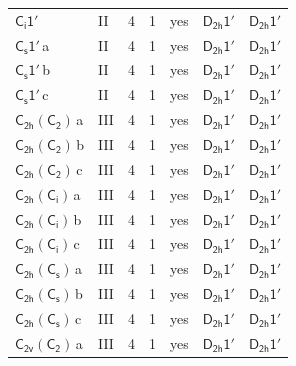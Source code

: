 \documentclass[10pt,a4paper]{article}
\numberwithin{equation}{section}
\newcommand{\grp}[1]{\mathsf{#1}}
\newcommand{\clsletter}[1]{\,{\scriptsize\color{black!55}#1}}
\begin{document}
{\begin{longtable}{@{}llrrlll@{}}
\href{S2-1p.pdf}{$\grp{C_{i}1'}$} & II & 4 & 1 & yes & \href{D2h-1p.pdf}{$\grp{D_{2h}1'}$} & \href{D2h-1p.pdf}{$\grp{D_{2h}1'}$}\\
\href{C1v-1p.pdf}{$\grp{C_{s}1'}$}\clsletter{a} & II & 4 & 1 & yes & \href{D2h-1p.pdf}{$\grp{D_{2h}1'}$} & \href{D2h-1p.pdf}{$\grp{D_{2h}1'}$}\\
\href{C1v-1p.pdf}{$\grp{C_{s}1'}$}\clsletter{b} & II & 4 & 1 & yes & \href{D2h-1p.pdf}{$\grp{D_{2h}1'}$} & \href{D2h-1p.pdf}{$\grp{D_{2h}1'}$}\\
\href{C1v-1p.pdf}{$\grp{C_{s}1'}$}\clsletter{c} & II & 4 & 1 & yes & \href{D2h-1p.pdf}{$\grp{D_{2h}1'}$} & \href{D2h-1p.pdf}{$\grp{D_{2h}1'}$}\\
\href{C2h-C2.pdf}{$\grp{C_{2h}}(\grp{C_{2}})$}\clsletter{a} & III & 4 & 1 & yes & \href{D2h-1p.pdf}{$\grp{D_{2h}1'}$} & \href{D2h-1p.pdf}{$\grp{D_{2h}1'}$}\\
\href{C2h-C2.pdf}{$\grp{C_{2h}}(\grp{C_{2}})$}\clsletter{b} & III & 4 & 1 & yes & \href{D2h-1p.pdf}{$\grp{D_{2h}1'}$} & \href{D2h-1p.pdf}{$\grp{D_{2h}1'}$}\\
\href{C2h-C2.pdf}{$\grp{C_{2h}}(\grp{C_{2}})$}\clsletter{c} & III & 4 & 1 & yes & \href{D2h-1p.pdf}{$\grp{D_{2h}1'}$} & \href{D2h-1p.pdf}{$\grp{D_{2h}1'}$}\\
\href{C2h-S2.pdf}{$\grp{C_{2h}}(\grp{C_{i}})$}\clsletter{a} & III & 4 & 1 & yes & \href{D2h-1p.pdf}{$\grp{D_{2h}1'}$} & \href{D2h-1p.pdf}{$\grp{D_{2h}1'}$}\\
\href{C2h-S2.pdf}{$\grp{C_{2h}}(\grp{C_{i}})$}\clsletter{b} & III & 4 & 1 & yes & \href{D2h-1p.pdf}{$\grp{D_{2h}1'}$} & \href{D2h-1p.pdf}{$\grp{D_{2h}1'}$}\\
\href{C2h-S2.pdf}{$\grp{C_{2h}}(\grp{C_{i}})$}\clsletter{c} & III & 4 & 1 & yes & \href{D2h-1p.pdf}{$\grp{D_{2h}1'}$} & \href{D2h-1p.pdf}{$\grp{D_{2h}1'}$}\\
\href{C2h-C1v.pdf}{$\grp{C_{2h}}(\grp{C_{s}})$}\clsletter{a} & III & 4 & 1 & yes & \href{D2h-1p.pdf}{$\grp{D_{2h}1'}$} & \href{D2h-1p.pdf}{$\grp{D_{2h}1'}$}\\
\href{C2h-C1v.pdf}{$\grp{C_{2h}}(\grp{C_{s}})$}\clsletter{b} & III & 4 & 1 & yes & \href{D2h-1p.pdf}{$\grp{D_{2h}1'}$} & \href{D2h-1p.pdf}{$\grp{D_{2h}1'}$}\\
\href{C2h-C1v.pdf}{$\grp{C_{2h}}(\grp{C_{s}})$}\clsletter{c} & III & 4 & 1 & yes & \href{D2h-1p.pdf}{$\grp{D_{2h}1'}$} & \href{D2h-1p.pdf}{$\grp{D_{2h}1'}$}\\
\href{C2v-C2.pdf}{$\grp{C_{2v}}(\grp{C_{2}})$}\clsletter{a} & III & 4 & 1 & yes & \href{D2h-1p.pdf}{$\grp{D_{2h}1'}$} & \href{D2h-1p.pdf}{$\grp{D_{2h}1'}$}\\

\end{longtable}}
\end{document}
